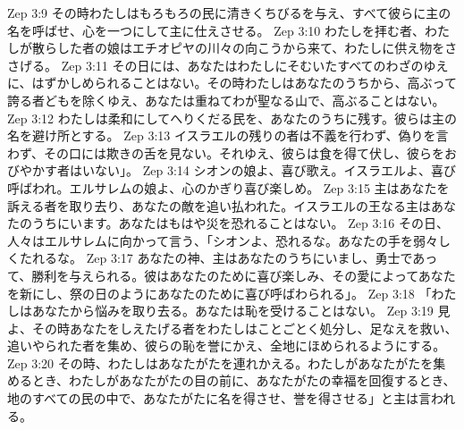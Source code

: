 Zep 3:9  その時わたしはもろもろの民に清きくちびるを与え、すべて彼らに主の名を呼ばせ、心を一つにして主に仕えさせる。
Zep 3:10  わたしを拝む者、わたしが散らした者の娘はエチオピヤの川々の向こうから来て、わたしに供え物をささげる。
Zep 3:11  その日には、あなたはわたしにそむいたすべてのわざのゆえに、はずかしめられることはない。その時わたしはあなたのうちから、高ぶって誇る者どもを除くゆえ、あなたは重ねてわが聖なる山で、高ぶることはない。
Zep 3:12  わたしは柔和にしてへりくだる民を、あなたのうちに残す。彼らは主の名を避け所とする。
Zep 3:13  イスラエルの残りの者は不義を行わず、偽りを言わず、その口には欺きの舌を見ない。それゆえ、彼らは食を得て伏し、彼らをおびやかす者はいない」。
Zep 3:14  シオンの娘よ、喜び歌え。イスラエルよ、喜び呼ばわれ。エルサレムの娘よ、心のかぎり喜び楽しめ。
Zep 3:15  主はあなたを訴える者を取り去り、あなたの敵を追い払われた。イスラエルの王なる主はあなたのうちにいます。あなたはもはや災を恐れることはない。
Zep 3:16  その日、人々はエルサレムに向かって言う、「シオンよ、恐れるな。あなたの手を弱々しくたれるな。
Zep 3:17  あなたの神、主はあなたのうちにいまし、勇士であって、勝利を与えられる。彼はあなたのために喜び楽しみ、その愛によってあなたを新にし、祭の日のようにあなたのために喜び呼ばわられる」。
Zep 3:18  「わたしはあなたから悩みを取り去る。あなたは恥を受けることはない。
Zep 3:19  見よ、その時あなたをしえたげる者をわたしはことごとく処分し、足なえを救い、追いやられた者を集め、彼らの恥を誉にかえ、全地にほめられるようにする。
Zep 3:20  その時、わたしはあなたがたを連れかえる。わたしがあなたがたを集めるとき、わたしがあなたがたの目の前に、あなたがたの幸福を回復するとき、地のすべての民の中で、あなたがたに名を得させ、誉を得させる」と主は言われる。


